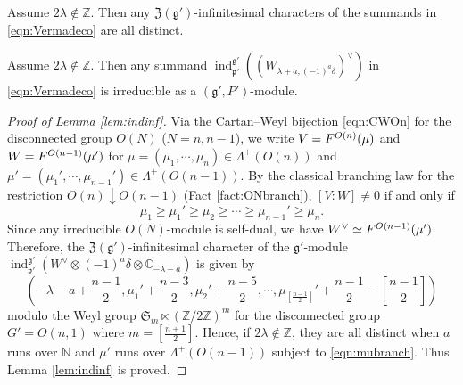 \begin{lemma}
\label{lem:indinf}
Assume $2 \lambda \not \in {\mathbb{Z}}$.  
Then any ${\mathfrak{Z}}({\mathfrak{g}}')$-infinitesimal characters
 of the summands in \eqref{eqn:Vermadeco}
 are all distinct.  
\end{lemma}

\begin{lemma}
\label{lem:indirred}
Assume $2 \lambda \not \in {\mathbb{Z}}$.  
Then any summand 
$
   {\operatorname{ind}}_{\mathfrak{p}'}^{\mathfrak{g}'}
   ((W_{\lambda+a,(-1)^a \delta})^{\vee})
$
 in \eqref{eqn:Vermadeco}
 is irreducible as a $({\mathfrak{g}}',P')$-module.  
\end{lemma}

\begin{proof}
[Proof of Lemma \ref{lem:indinf}]
Via the Cartan--Weyl bijection \eqref{eqn:CWOn}
 for the disconnected group $O(N)$
 ($N=n,n-1$), 
 we write $V=F^{{O(n)}}({\mu})$
 and $W=F^{{O(n-1)}}({\mu'})$
 for $\mu=(\mu_1, \cdots,\mu_n) \in \Lambda^{+}(O(n))$
 and $\mu'=(\mu_1', \cdots,\mu_{n-1}') \in \Lambda^{+}(O(n-1))$.  
By the classical 
branching law
 for the restriction $O(n) \downarrow O(n-1)$
 (Fact \ref{fact:ONbranch}), 
 $[V:W] \ne 0$
 if and only if
\begin{equation}
\label{eqn:mubranch}
  \mu_1 \ge \mu_1' \ge \mu_2 \ge \cdots \ge \mu_{n-1}' \ge \mu_{n}.   
\end{equation}
Since any irreducible $O(N)$-module
 is self-dual, 
 we have $W^{\vee} \simeq F^{{O(n-1)}}({\mu'})$.  
Therefore, 
 the 
${\mathfrak{Z}}({\mathfrak{g}}')$-infinitesimal character
 of the ${\mathfrak{g}}'$-module 
${\operatorname{ind}}_{\mathfrak{p}'}^{\mathfrak{g}'}
 (W^{\vee} \otimes (-1)^a\delta \otimes {\mathbb{C}}_{-\lambda-a})
$ 
 is given by
\[
  (-\lambda-a+\frac{n-1}{2}, 
   \mu_1'+\frac{n-3}{2},
   \mu_2'+ \frac{n-5}{2}, 
   \cdots, 
   \mu_{[\frac{n-1}{2}]}'+\frac{n-1}{2}- [\frac{n-1}{2}])
\]
 modulo the Weyl group
 ${\mathfrak{S}}_m \ltimes ({\mathbb{Z}}/2 {\mathbb{Z}})^m$
 for the disconnected group $G'=O(n,1)$
 where $m=[\frac{n+1}{2}]$.  
Hence,
 if $2 \lambda \not \in {\mathbb{Z}}$, 
they are all distinct
 when $a$ runs over ${\mathbb{N}}$
 and $\mu'$ runs over $\Lambda^+(O(n-1))$
 subject to \eqref{eqn:mubranch}.  
Thus Lemma \ref{lem:indinf} is proved.  
\end{proof}
